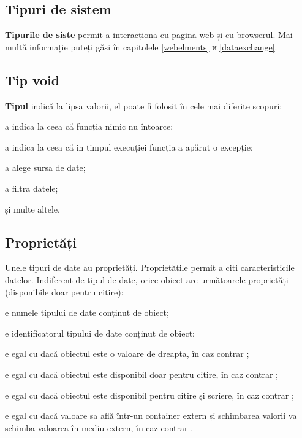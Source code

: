 \subsection{Tipuri de sistem}

{\bf Tipurile de siste} permit a interacționa cu pagina web și cu browserul. Mai multă informație puteți găsi în capitolele \ref{webelments} и \ref{dataexchange}.

\subsection{Tip {\color{lightblue} void}}

{\bf Tipul \void{}} indică la lipsa valorii, el poate fi folosit în cele mai diferite scopuri:

\begin{icItems}
\item
	a indica la ceea că funcția nimic nu întoarce;
\item
	a indica la ceea că in timpul execuției funcția a apărut o excepție;
\item
	a alege sursa de date;
\item
	a filtra datele;
\item
	și multe altele.
\end{icItems}


\subsection{Proprietăți}

Unele tipuri de date au proprietăți. Proprietățile permit a citi caracteristicile datelor. Indiferent de tipul de date, orice obiect are următoarele proprietăți (disponibile doar pentru citire):

\begin{icItems}
\item
	 e numele tipului de date conținut de obiect;
\item
	 e identificatorul tipului de date conținut de obiect;
\item
	 e egal cu \true{} dacă obiectul este o valoare de dreapta, în caz contrar \false{};
\item
	 e egal cu \true{} dacă obiectul este disponibil doar pentru citire, în caz contrar \false{};
\item
	 e egal cu \true{} dacă obiectul este disponibil pentru citire și scriere, în caz contrar \false{};
\item
	 e egal cu \true{} dacă valoare sa află într-un container extern și schimbarea valorii va schimba valoarea în mediu extern, în caz contrar \false{}.
\end{icItems}


